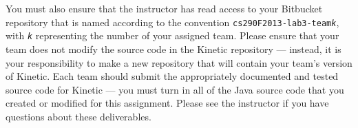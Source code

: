 You must also ensure that the instructor has read access to your Bitbucket repository that is named according to the
convention {\tt cs290F2013-lab3-team{\em k}}, with {\tt {\em k}} representing the number of your assigned team.  Please
ensure that your team does not modify the source code in the Kinetic repository --- instead, it is your responsibility
to make a new repository that will contain your team's version of Kinetic.  Each team should submit the appropriately
documented and tested source code for Kinetic --- you must turn in all of the Java source code that you created
or modified for this assignment. Please see the instructor if you have questions about these deliverables.


